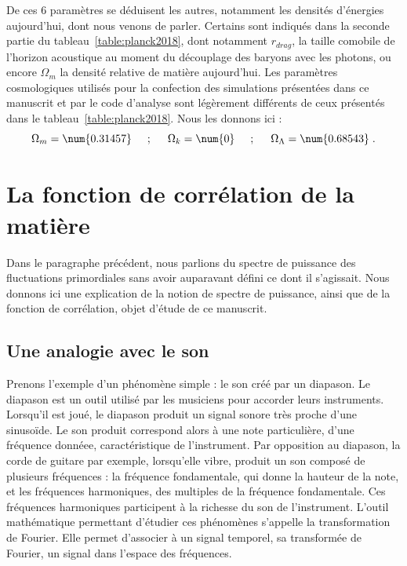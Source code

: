 De ces 6 paramètres se déduisent les autres, notamment les densités d'énergies aujourd'hui, dont nous venons de parler. Certains sont indiqués dans la seconde partie du tableau~\ref{table:planck2018},
dont notamment $r_{drag}$, la taille comobile de l'horizon acoustique au moment du découplage des baryons avec les photons,
ou encore $\Omega_m$ la densité relative de matière aujourd'hui. Les paramètres cosmologiques utilisés pour la confection des simulations présentées dans ce manuscrit et par le code d'analyse \picca{} sont légèrement différents de ceux présentés dans le tableau~\ref{table:planck2018}. Nous les donnons ici :
\begin{equation}
  \label{eq:par_cosmo}
  \Omega_m = \num{0.31457} \hspace{0.5cm} ; \hspace{0.5cm} \Omega_k = \num{0} \hspace{0.5cm} ; \hspace{0.5cm} \Omega_{\Lambda} = \num{0.68543}  \; .
\end{equation}



\section{La fonction de corrélation de la matière}

Dans le paragraphe précédent, nous parlions du spectre de puissance des fluctuations primordiales sans avoir auparavant défini ce dont il s'agissait. Nous donnons ici une explication de la notion de spectre de puissance, ainsi que de la fonction de corrélation, objet d'étude de ce manuscrit.

\subsection{Une analogie avec le son}

Prenons l'exemple d'un phénomène simple : le son créé par un diapason. Le diapason est un outil utilisé par les musiciens pour accorder leurs instruments. Lorsqu'il est joué, le diapason produit un signal sonore très proche d'une sinusoïde.
Le son produit correspond alors à une note particulière, d'une fréquence donnéee, caractéristique de l'instrument. Par opposition au diapason, la corde de guitare par exemple, lorsqu'elle vibre, produit un son composé de plusieurs fréquences : la fréquence fondamentale, qui donne la hauteur de la note, et les fréquences harmoniques, des multiples de la fréquence fondamentale. Ces fréquences harmoniques participent à la richesse du son de l'instrument. L'outil mathématique permettant d'étudier ces phénomènes s'appelle la transformation de Fourier. Elle permet d'associer à un signal temporel, sa transformée de Fourier, un signal dans l'espace des fréquences.

